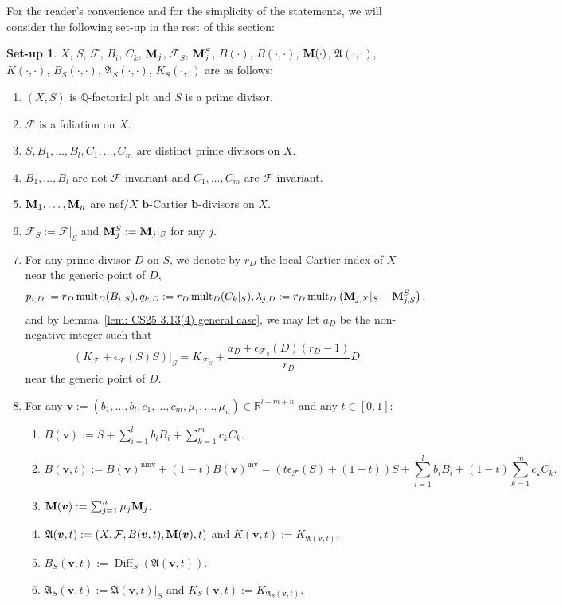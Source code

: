\documentclass[11pt,reqno]{amsart}
\numberwithin{equation}{section}
\newcommand{\bb}{\bm{b}}
\newcommand{\Mm}{{\bf{M}}}
\newcommand{\ninv}{\operatorname{ninv}}
\newcommand{\inv}{\operatorname{inv}}
\newcommand{\Diff}{\operatorname{Diff}}
\newcommand{\mult}{\operatorname{mult}}
\newcommand{\Aa}{{\mathfrak{A}}}
\newcommand{\Ff}{\mathcal{F}}
\theoremstyle{definition}
\newtheorem{setup}[thm]{Set-up}
\begin{document}
For the reader's convenience and for the simplicity of the statements, we will consider the following set-up in the rest of this section:

\begin{setup}\label{setup: pa no m}
$X$, $S$, $\Ff$, $B_i$, $C_k$, $\Mm_j$, $\Ff_S$, $\Mm^S_j$, $B(\cdot)$, $B(\cdot,\cdot)$, $\Mm(\cdot)$, $\Aa(\cdot,\cdot)$, $K(\cdot,\cdot)$, $B_S(\cdot,\cdot)$, $\Aa_S(\cdot,\cdot)$, $K_S(\cdot,\cdot)$ are as follows:
\begin{enumerate}
\item $(X,S)$ is $\mathbb Q$-factorial plt and $S$ is a prime divisor.
\item $\Ff$ is a foliation on $X$.
\item $S,B_1,\dots,B_l,C_1,\dots,C_m$ are distinct prime divisors on $X$.
\item $B_1,\dots,B_l$ are not $\Ff$-invariant and $C_1,\dots,C_m$ are $\Ff$-invariant.
\item $\Mm_1,\dots,\Mm_n$ are nef$/X$ $\bb$-Cartier $\bb$-divisors on $X$.
\item $\Ff_S:=\Ff|_S$ and $\Mm^S_j:=\Mm_j|_S$ for any $j$.
\item For any prime divisor $D$ on $S$, we denote by $r_D$ the local Cartier index of $X$ near the generic point of $D$,
$$p_{i,D}:=r_D\mult_{D}(B_i|_S),q_{k,D}:=r_D\mult_{D}(C_k|_S),\lambda_{j,D}:=r_D\mult_D\left(\Mm_{j,X}|_S-\Mm^S_{j,S}\right),$$
and by Lemma~\ref{lem: CS25 3.13(4) general case}, we may let $a_D$ be the non-negative integer such that
$$(K_{\Ff}+\epsilon_{\Ff}(S)S)|_S=K_{\Ff_S}+\frac{a_D+\epsilon_{\Ff_S}(D)(r_D-1)}{r_D}D$$
near the generic point of $D$.
\item For any $\bm{v}:=(b_1,\dots,b_l,c_1,\dots,c_m,\mu_1,\dots,\mu_n)\in\mathbb R^{l+m+n}$ and any $t\in [0,1]$:
\begin{enumerate}
\item $B(\bm{v}):=S+\sum_{i=1}^lb_iB_i+\sum_{k=1}^mc_kC_k$.
\item 
$$B(\bm{v},t):=B(\bm{v})^{\ninv}+(1-t)B(\bm{v})^{\inv}=(t\epsilon_{\Ff}(S)+(1-t))S+\sum_{i=1}^lb_iB_i+(1-t)\sum_{k=1}^mc_kC_k.$$ 
\item $\Mm(\bm{v}):=\sum_{j=1}^n\mu_j\Mm_j$.
\item $\Aa(\bm{v},t):=(X,\Ff,B(\bm{v},t),\Mm(\bm{v}),t)$ and $K(\bm{v},t):=K_{\Aa(\bm{v},t)}$.
\item $B_S(\bm{v},t):=\Diff_S(\Aa(\bm{v},t))$.
\item $\Aa_S(\bm{v},t):=\Aa(\bm{v},t)|_S$ and $K_S(\bm{v},t):=K_{\Aa_S(\bm{v},t)}$.
\end{enumerate}
\end{enumerate}
\end{setup}
\end{document}
